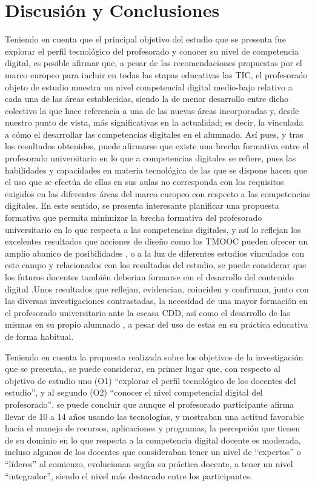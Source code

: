 \documentclass[spanish]{textolivre}
\begin{document}
\section{Discusión y Conclusiones}
Teniendo en cuenta que el principal objetivo del estudio que se presenta fue explorar el perfil tecnológico del profesorado y conocer su nivel de competencia digital, es posible afirmar que, a pesar de las recomendaciones propuestas por el marco europeo para incluir en todas las etapas educativas las TIC, el profesorado objeto de estudio muestra un nivel competencial digital medio-bajo relativo a cada una de las áreas establecidas, siendo la de menor desarrollo entre dicho colectivo la que hace referencia a una de las nuevas áreas incorporadas y, desde nuestro punto de vista, más significativas en la actualidad; es decir, la vinculada a cómo el desarrollar las competencias digitales en el alumnado. Así pues, y tras los resultados obtenidos, puede afirmarse que existe una brecha formativa entre el profesorado universitario en lo que a competencias digitales se refiere, pues las habilidades y capacidades en materia tecnológica de las que se dispone hacen que el uso que se efectúa de ellas en sus aulas no corresponda con los requisitos exigidos en las diferentes áreas del marco europeo con respecto a las competencias digitales. En este sentido, se presenta interesante planificar una propuesta formativa que permita minimizar la brecha formativa del profesorado universitario en lo que respecta a las competencias digitales, y así lo reflejan los excelentes resultados que acciones de diseño como los TMOOC pueden ofrecer un amplio abanico de posibilidades \cite{cabero-almenara2020, cabero-almenara2021}, o a la luz de diferentes estudios vinculados con este campo y relacionados con los resultados del estudio, se puede considerar que los futuros docentes también deberian formarse em el desarrollo del contenido digital \cite{burgos2021, cebi2020}.Unos resultados que reflejan, evidencian, coinciden y confirman, junto con las diversas investigaciones contrastadas, la necesidad de una mayor formación en el profesorado universitario ante la escasa CDD, así como el desarrollo de las mismas en su propio alumnado \cite{barroso2019, domingo-coscollola2019, fernandez-marquez2018, mueller2008, pinto-santos2020, pozo2019, pozos2018}, a pesar del uso de estas en su práctica educativa de forma habitual.

Teniendo en cuenta la propuesta realizada sobre los objetivos de la investigación que se presenta,, se puede considerar, en primer lugar que, con respecto al objetivo de estudio uno (O1) “explorar el perfil tecnológico de los docentes del estudio”, y al segundo (O2) “conocer el nivel competencial digital del profesorado”, se puede concluir que aunque el profesorado participante afirma llevar de 10 a 14 años usando las tecnologías, y mostraban una actitud favorable hacia el manejo de recursos, aplicaciones y programas, la percepción que tienen de su dominio en lo que respecta a la competencia digital docente es moderada, incluso algunos de los docentes que consideraban tener un nivel de “expertos” o “líderes” al comienzo, evolucionan según su práctica docente, a tener un nivel “integrador”, siendo el nivel más destacado entre los participantes.
\end{document}
